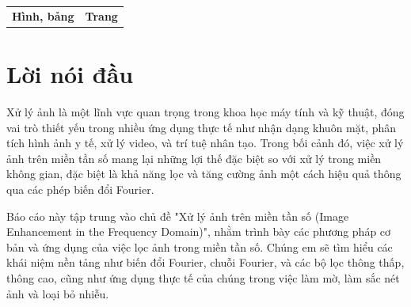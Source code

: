 \documentclass[12pt,a4paper]{report}
\numberwithin{equation}{section}
\theoremstyle{definition} %
\begin{document}
\begin{longtable}{l   l }
	\textbf{Hình, bảng}  & \textbf{Trang}       \\


\end{longtable}


	\newpage
	\chapter*{Lời nói đầu}
	\thispagestyle{fancy}
	\renewcommand{\baselinestretch}{1.2}

	\indent
	Xử lý ảnh là một lĩnh vực quan trọng trong khoa học máy tính và kỹ thuật, đóng vai trò thiết yếu trong nhiều ứng dụng thực tế như nhận dạng khuôn mặt, phân tích hình ảnh y tế, xử lý video, và trí tuệ nhân tạo. Trong bối cảnh đó, việc xử lý ảnh trên miền tần số mang lại những lợi thế đặc biệt so với xử lý trong miền không gian, đặc biệt là khả năng lọc và tăng cường ảnh một cách hiệu quả thông qua các phép biến đổi Fourier.

	Báo cáo này tập trung vào chủ đề "Xử lý ảnh trên miền tần số (Image Enhancement in the Frequency Domain)", nhằm trình bày các phương pháp cơ bản và ứng dụng của việc lọc ảnh trong miền tần số. Chúng em sẽ tìm hiểu các khái niệm nền tảng như biến đổi Fourier, chuỗi Fourier, và các bộ lọc thông thấp, thông cao, cũng như ứng dụng thực tế của chúng trong việc làm mờ, làm sắc nét ảnh và loại bỏ nhiễu.
\end{document}
